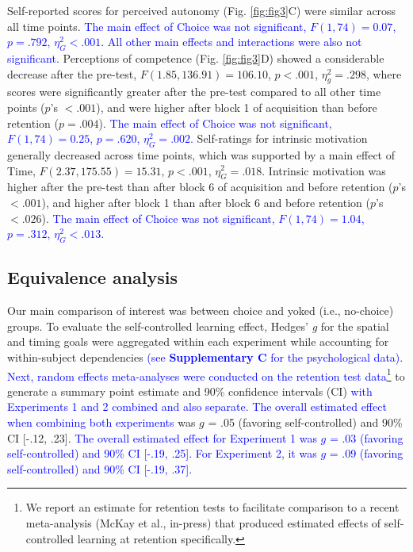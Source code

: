 \documentclass[
  man, donotrepeattitle,floatsintext]{apa7}
\begin{document}
Self-reported scores for perceived autonomy (Fig. \ref{fig:fig3}C) were similar across all time points. \textcolor{blue}{The main effect of Choice was not significant, $F(1,74) = 0.07$, $p = .792$, $\eta_{G}^2 < .001$. All other main effects and interactions were also not significant.} Perceptions of competence (Fig. \ref{fig:fig3}D) showed a considerable decrease after the pre-test, \(F(1.85,136.91) = 106.10\), \(p < .001\), \(\eta_{g}^2 = .298\), where scores were significantly greater after the pre-test compared to all other time points (\(p\)'s \(< .001\)), and were higher after block 1 of acquisition than before retention (\(p = .004\)). \textcolor{blue}{The main effect of Choice was not significant, $F(1,74) = 0.25$, $p = .620$, $\eta_{G}^2 = .002$.} Self-ratings for intrinsic motivation generally decreased across time points, which was supported by a main effect of Time, \(F(2.37,175.55) = 15.31\), \(p < .001\), \(\eta_{G}^2 = .018\). Intrinsic motivation was higher after the pre-test than after block 6 of acquisition and before retention (\(p\)'s \(< .001\)), and higher after block 1 than after block 6 and before retention (\(p\)'s \(< .026\)). \textcolor{blue}{The main effect of Choice was not significant, $F(1,74) = 1.04$, $p = .312$, $\eta_{G}^2 < .013$.}

\hypertarget{equivalence-analysis}{%
\subsection{Equivalence analysis}\label{equivalence-analysis}}

Our main comparison of interest was between choice and yoked (i.e., no-choice) groups. To evaluate the self-controlled learning effect, Hedges' \emph{g} for the spatial and timing goals were aggregated within each experiment while accounting for within-subject dependencies \textcolor{blue}{(see \textbf{Supplementary C} for the psychological data). Next, random effects meta-analyses were conducted on the retention test data}\footnote{We report an estimate for retention tests to facilitate comparison to a recent meta-analysis (McKay et al., in-press) that produced estimated effects of self-controlled learning at retention specifically.} to generate a summary point estimate and 90\% confidence intervals (CI) \textcolor{blue}{with Experiments 1 and 2 combined and also separate. The overall estimated effect when combining both experiments} was \(g\) = .05 (favoring self-controlled) and 90\% CI {[}-.12, .23{]}. \textcolor{blue}{The overall estimated effect for Experiment 1 was $g$ = .03 (favoring self-controlled) and 90\% CI [-.19, .25]. For Experiment 2, it was $g$ = .09 (favoring self-controlled) and 90\% CI [-.19, .37].}
\end{document}

